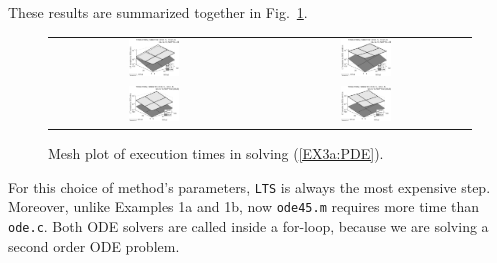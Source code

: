 \documentclass[a4paper,10pt]{report}%
\begin{document}
These results are summarized together in Fig.~\ref{EX3a_times3D_tol4}.
\begin{figure}[htb]
\centering
\begin{tabular}{cc}
\includegraphics[width=0.25\textwidth]{./FIGS/EX3a/EX3a_times3D_tol4_1.eps} &
\includegraphics[width=0.25\textwidth]{./FIGS/EX3a/EX3a_times3D_tol4_3.eps} \\
\includegraphics[width=0.25\textwidth]{./FIGS/EX3a/EX3a_times3D_tol4_2.eps} &
\includegraphics[width=0.25\textwidth]{./FIGS/EX3a/EX3a_times3D_tol4_4.eps}
\end{tabular}
\caption{\small Mesh plot of execution times in solving (\ref{EX3a:PDE}).}
\label{EX3a_times3D_tol4}
\end{figure}

\newpage
\noindent For this choice of method's parameters, {\tt LTS} is always the most expensive step.
Moreover, unlike Examples 1a and 1b, now {\tt ode45.m} requires more time than {\tt ode.c}.
Both ODE solvers are called inside a for-loop, because we are solving a second order ODE problem.



\end{document}
